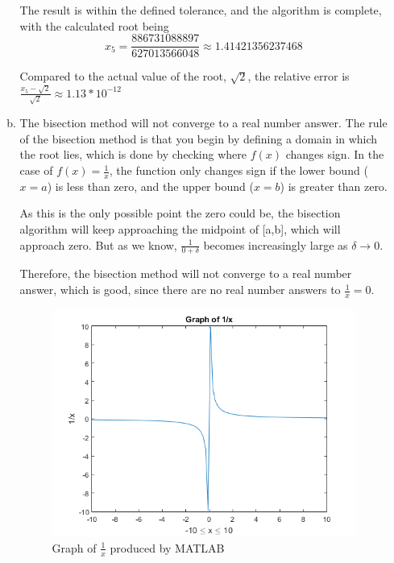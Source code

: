 \documentclass[11pt]{article}
\begin{document}
\begin{enumerate}
\begin{enumerate}[(a)]
		The result is within the defined tolerance, and the algorithm is complete, with the calculated root being
		$$x_5 = \frac{886731088897}{627013566048} \approx 1.41421356237468$$

		Compared to the actual value of the root, $\sqrt{2}$, the relative error is
		$\frac{x_5 - \sqrt{2}}{\sqrt{2}} \approx 1.13*10^{-12}$ \\

		\item The bisection method will not converge to a real number answer. The rule of the bisection method is that you begin by
		defining a domain in which the root lies, which is done by checking where $f(x)$ changes sign. In the case of
		$f(x) = \frac{1}{x} $, the function only changes sign if the lower bound ($x=a$) is less than zero, and the upper bound
		($x=b$) is greater than zero.

		As this is the only possible point the zero could be, the bisection algorithm will keep approaching the midpoint of
		[a,b], which will approach zero. But as we know,
		$\frac{1}{0+\delta}$ becomes increasingly large as $\delta \to 0$.

		Therefore, the bisection method will not converge to a real number answer, which is good, since there are no real number
		answers to $\frac{1}{x} = 0$. \\

		\begin{figure}[H]
			\centering
			\includegraphics{q1i.png}
			\caption{Graph of $\frac{1}{x}$ produced by MATLAB}
		\end{figure}


\end{enumerate}
\end{enumerate}
\end{document}
